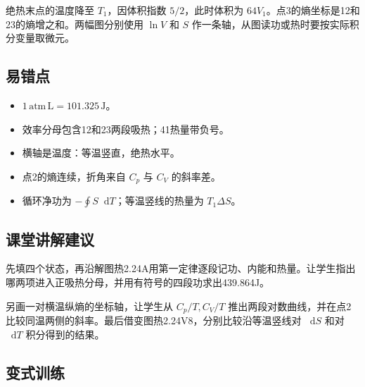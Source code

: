 \documentclass[UTF8,fontset=fandol,a4paper,11pt]{ctexart}
\newcommand{\dd}{\mathop{}\!\mathrm{d}}
\begin{document}
绝热末点的温度降至 $T_1$，因体积指数 $5/2$，此时体积为 $64V_1$。点3的熵坐标是12和23的熵增之和。两幅图分别使用 $\ln V$ 和 $S$ 作一条轴，从图读功或热时要按实际积分变量取微元。



\subsection*{易错点}

\begin{itemize}
\item $1\,\mathrm{atm\,L}=101.325\,\mathrm J$。
\item 效率分母包含12和23两段吸热；41热量带负号。
\item 横轴是温度：等温竖直，绝热水平。
\item 点2的熵连续，折角来自 $C_p$ 与 $C_V$ 的斜率差。
\item 循环净功为 $-\oint S\dd T$；等温竖线的热量为 $T_1\Delta S$。
\end{itemize}



\subsection*{课堂讲解建议}

先填四个状态，再沿解图热2.24A用第一定律逐段记功、内能和热量。让学生指出哪两项进入正吸热分母，并用有符号的四段功求出439.864J。

另画一对横温纵熵的坐标轴，让学生从 $C_p/T,C_V/T$ 推出两段对数曲线，并在点2比较同温两侧的斜率。最后借变图热2.24V8，分别比较沿等温竖线对 $\dd S$ 和对 $\dd T$ 积分得到的结果。



\subsection*{变式训练}
\end{document}
